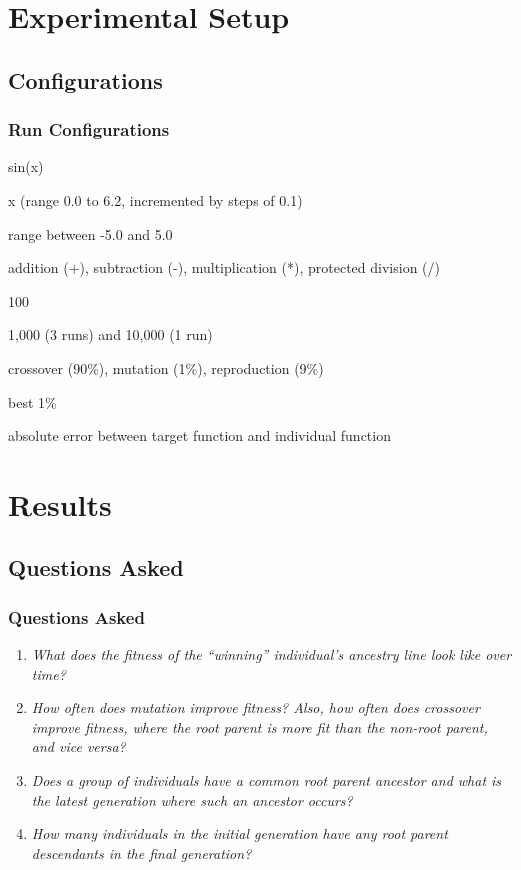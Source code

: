\documentclass{beamer}
\begin{document}
\section[Setup]{Experimental Setup}

\subsection{Configurations}

\begin{frame}
\frametitle{Run Configurations}
\begin{description}[align=left, leftmargin=*]
{\small
\item[Target Function] sin(x)
\item[Variables] x (range 0.0 to 6.2, incremented by steps of 0.1)
\item[Constants] range between -5.0 and 5.0
\item[Operations] addition (+), subtraction (-), multiplication (*), protected division (/)
\item[Generation Number] 100
\item[Population Size Per Gen] 1,000 (3 runs) and 10,000 (1 run)
\item[Transform Percentages] crossover (90\%), mutation (1\%), reproduction (9\%)
\item[Elitism] best 1\%
\item[Fitness] absolute error between target function and individual function
}
\end{description}
\end{frame}

\section[Results]{Results}

\subsection[Questions Asked]{Questions Asked}

\begin{frame}
\frametitle{Questions Asked}
\begin{enumerate}
\item \emph{What does the fitness of the ``winning'' individual's ancestry line look like over time?}
\item \emph{How often does mutation improve fitness? Also, how often does crossover improve fitness, where the root parent is more fit than the non-root parent, and vice versa?}
\item \emph{Does a group of individuals have a common root parent ancestor and what is the latest generation where such an ancestor occurs?}
\item \emph{How many individuals in the initial generation have any root parent descendants in the final generation?}
\end{enumerate}
\end{frame}
\end{document}
